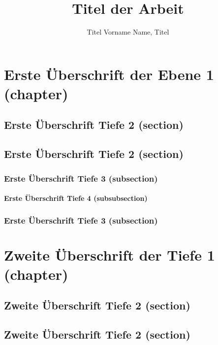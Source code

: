 \documentclass[Master,english,IEEE]{twbook}
\title{Titel der Arbeit}
\author{Titel Vorname Name, Titel}
\begin{document}
\maketitle

%
%
\chapter{Erste Überschrift der Ebene 1 (chapter)}
\blindmathpaper

\section{Erste Überschrift Tiefe 2 (section)}
\blindtext

\section{Erste Überschrift Tiefe 2 (section)}
\blindtext

\subsection{Erste Überschrift Tiefe 3 (subsection)}
\blindtext

\subsubsection{Erste Überschrift Tiefe 4 (subsubsection)}
\blindtext

\subsection{Erste Überschrift Tiefe 3 (subsection)}
\blindtext

\chapter{Zweite Überschrift der Tiefe 1 (chapter)}
\blindtext

\section{Zweite Überschrift Tiefe 2 (section)}
\blindtext

\section{Zweite Überschrift Tiefe 2 (section)}
\blindtext
\end{document}

